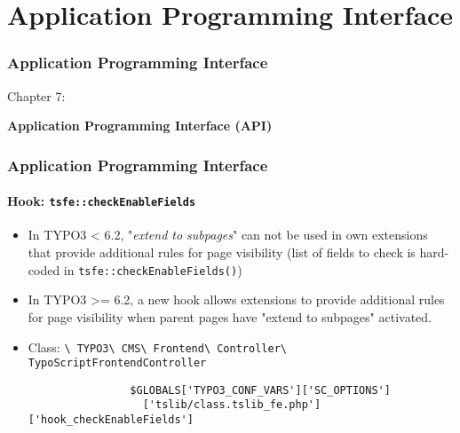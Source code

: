 %

\section{Application Programming Interface}
\begin{frame}[fragile]
	\frametitle{Application Programming Interface}

	\begin{center}\huge{Chapter 7:}\end{center}
	\begin{center}\huge{\color{typo3darkgrey}\textbf{Application Programming Interface (API)}}\end{center}

\end{frame}


\begin{frame}[fragile]
	\frametitle{Application Programming Interface}
	\framesubtitle{Hook: \texttt{tsfe::checkEnableFields}}

	\begin{itemize}
		\item In TYPO3 < 6.2, "\emph{extend to subpages}" can not be used in own extensions that provide additional rules for page visibility\newline
			\small(list of fields to check is hard-coded in \texttt{tsfe::checkEnableFields()})\normalsize

		\item In TYPO3 >= 6.2, a new hook allows extensions to provide additional rules for page visibility when parent pages have "extend to subpages" activated.
		\item Class:\newline
			\smaller
				\texttt{\textbackslash
					TYPO3\textbackslash
					CMS\textbackslash
					Frontend\textbackslash
					Controller\textbackslash
					TypoScriptFrontendController}\normalsize

			\lstset{
				basicstyle=\smaller\ttfamily
			}

			\begin{lstlisting}
				$GLOBALS['TYPO3_CONF_VARS']['SC_OPTIONS']
				  ['tslib/class.tslib_fe.php']['hook_checkEnableFields']
			\end{lstlisting}

	\end{itemize}

\end{frame}

